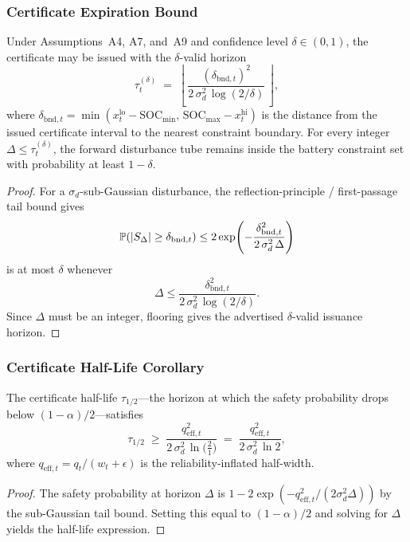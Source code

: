 \subsubsection{Certificate Expiration Bound}

\begin{theorem}
\label{thm:cert-expiration}
Under Assumptions~A4, A7, and~A9 and confidence level $\delta\in(0,1)$, the
certificate may be issued with the $\delta$-valid horizon
\[
  \tau_t^{(\delta)} \;=\;
  \left\lfloor\,
    \frac{(\delta_{\text{bnd},t})^2}
         {2\,\sigma_d^2\,\log(2/\delta)}
  \,\right\rfloor,
\]
where $\delta_{\text{bnd},t} = \min(x_t^{\text{lo}} - \text{SOC}_{\min},\,
\text{SOC}_{\max} - x_t^{\text{hi}})$ is the distance from the issued
certificate interval to the nearest constraint boundary.  For every integer
$\Delta \le \tau_t^{(\delta)}$, the forward disturbance tube remains inside
the battery constraint set with probability at least $1-\delta$.
\end{theorem}

\begin{proof}
For a $\sigma_d$-sub-Gaussian disturbance, the reflection-principle /
first-passage tail bound gives
\[
  \operatorname{\mathbb{P}}(|S_\Delta| \ge \delta_{\text{bnd},t})
  \le
  2\exp\!\left(
    -\frac{\delta_{\text{bnd},t}^2}{2\,\sigma_d^2\,\Delta}
  \right)
\]
is at most $\delta$ whenever
\[
  \Delta \le
  \frac{\delta_{\text{bnd},t}^2}
       {2\,\sigma_d^2\,\log(2/\delta)}.
\]
Since $\Delta$ must be an integer, flooring gives the advertised
$\delta$-valid issuance horizon.
\end{proof}

\subsubsection{Certificate Half-Life Corollary}

\begin{corollary}
\label{cor:half-life}
The certificate half-life $\tau_{1/2}$---the horizon at which the
safety probability drops below $(1 - \alpha)/2$---satisfies
\[
  \tau_{1/2} \;\ge\;
  \frac{q_{\mathrm{eff},t}^2}
  {2\,\sigma_d^2\,\ln\!\bigl(\tfrac{2}{1}\bigr)}
  \;=\;
  \frac{q_{\mathrm{eff},t}^2}{2\,\sigma_d^2\,\ln 2},
\]
where $q_{\mathrm{eff},t} = q_t / (w_t + \epsilon)$ is the
reliability-inflated half-width.
\end{corollary}

\begin{proof}
The safety probability at horizon $\Delta$ is
$1 - 2\exp(-q_{\mathrm{eff},t}^2 / (2\sigma_d^2\Delta))$ by the
sub-Gaussian tail bound.  Setting this equal to $(1 - \alpha)/2$
and solving for $\Delta$ yields the half-life expression.
\end{proof}

